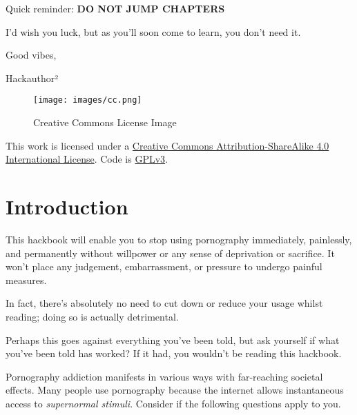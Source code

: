 \documentclass[
]{book}
\begin{document}
Quick reminder: {\textbf{DO NOT JUMP CHAPTERS}}

I'd wish you luck, but as you'll soon come to learn, you don't need it.

Good vibes,

Hackauthor²

\begin{figure}
\centering
\texttt{[image: images/cc.png]}
\caption{Creative Commons License Image}
\end{figure}

This work is licensed under a \href{https://creativecommons.org/licenses/by-sa/4.0/}{Creative Commons Attribution-ShareAlike 4.0 International License}. Code is \href{https://gitlab.com/snuggy/easypeasy/-/blob/master/LICENSE}{GPLv3}.

\hypertarget{introduction}{%
\chapter{Introduction}\label{introduction}}

This hackbook will enable you to stop using pornography immediately, painlessly, and permanently without willpower or any sense of deprivation or sacrifice. It won't place any judgement, embarrassment, or pressure to undergo painful measures.

In fact, there's absolutely no need to cut down or reduce your usage whilst reading; doing so is actually detrimental.

Perhaps this goes against everything you've been told, but ask yourself if what you've been told has worked? If it had, you wouldn't be reading this hackbook.

Pornography addiction manifests in various ways with far-reaching societal effects. Many people use pornography because the internet allows instantaneous access to \emph{supernormal stimuli}. Consider if the following questions apply to you.
\end{document}
